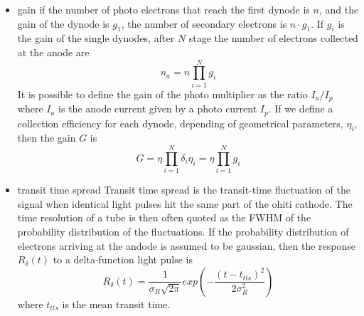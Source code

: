 \begin{itemize}
\item gain
if the number of photo electrons that reach the first dynode is $n$, and the gain of the dynode is $g_{1}$, the number of secondary electrons is $n\cdot g_{1}$. If $g_{i}$ is the gain of the single dynodes, after $N$ stage the number of electrons collected at the anode are
\begin{equation}
n_{a} = n\prod_{i=1}^N g_i
\end{equation}
It is possible to define the gain of the photo multiplier as the ratio $I_{a}/I_{p}$ where $I_{a}$ is the anode current given by a photo current $I_{p}$. If we define a collection efficiency for each dynode, depending of geometrical parameters, $\eta _{i}$, then the gain $G$ is
\begin{equation}
G = \eta \prod_{i=1}^N \delta _{i} \eta _{i} = \eta \prod_{i=1}^N g_{i}
\end{equation}
\item transit time spread
Transit time spread is the transit-time fluctuation of the signal when identical light pulses hit the same part of the ohiti cathode. The time resolution of a tube is then often quoted as the FWHM of the probability distribution of the fluctuations.
If the probability distribution of electrons arriving at the andode is assumed to be gaussian, then the response $R_{\delta}(t)$ to a delta-function light pulse is
\begin{equation}
R_{\delta}(t) = \frac{1}{\sigma _{R}\sqrt {2\pi}}exp\left( -\frac{(t-t_{tts})^2}{2\sigma _{R}^2}\right)
\end{equation}
where $t_{tts}$ is the mean transit time.
\end{itemize}

